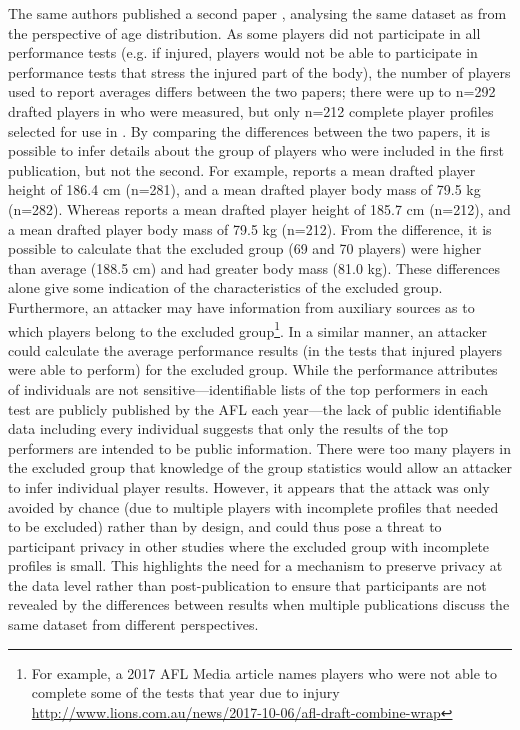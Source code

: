The same authors published a second paper \cite{Woods2015}, analysing the same dataset as \cite{Robertson2015} from the perspective of age distribution. As some players did not participate in all performance tests (e.g. if injured, players would not be able to participate in performance tests that stress the injured part of the body), the number of players used to report averages differs between the two papers; there were up to n=292 drafted players in \cite{Woods2015} who were measured, but only n=212 complete player profiles selected for use in \cite{Robertson2015}. By comparing the differences between the two papers, it is possible to infer details about the group of players who were included in the first publication, but not the second. For example, \cite{Robertson2015} reports a mean drafted player height of 186.4 cm (n=281), and a mean drafted player body mass of 79.5 kg (n=282). Whereas \cite{Woods2015} reports a mean drafted player height of 185.7 cm (n=212), and a mean drafted player body mass of 79.5 kg (n=212). From the difference, it is possible to calculate that the excluded group (69 and 70 players) were higher than average (188.5 cm) and had greater body mass (81.0 kg). These differences alone give some indication of the characteristics of the excluded group. Furthermore, an attacker may have information from auxiliary sources as to which players belong to the excluded group\footnote{For example, a 2017 AFL Media article names players who were not able to complete some of the tests that year due to injury \url{http://www.lions.com.au/news/2017-10-06/afl-draft-combine-wrap}}. In a similar manner, an attacker could calculate the average performance results (in the tests that injured players were able to perform) for the excluded group. While the performance attributes of individuals are not sensitive---identifiable lists of the top performers in each test are publicly published by the AFL each year---the lack of public identifiable data including every individual suggests that only the results of the top performers are intended to be public information. There were too many players in the excluded group that knowledge of the group statistics would allow an attacker to infer individual player results. However, it appears that the attack was only avoided by chance (due to multiple players with incomplete profiles that needed to be excluded) rather than by design, and could thus pose a threat to participant privacy in other studies where the excluded group with incomplete profiles is small. This highlights the need for a mechanism to preserve privacy at the data level rather than post-publication to ensure that participants are not revealed by the differences between results when multiple publications discuss the same dataset from different perspectives.


